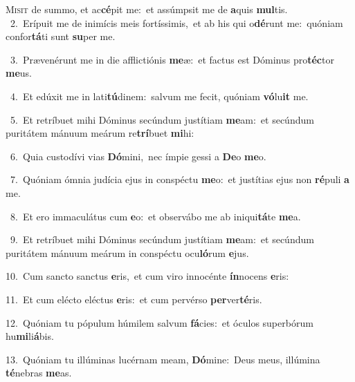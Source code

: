 \lettrine{\initial\textcolor{\initialcolor}{M}}{isit} de summo, et ac\-\textbf{cé}\-pit me:~\star et assúmpsit me de \textbf{a}\-quis \textbf{mul}\-tis.\\
{\numbfont\textcolor{\numbcolor}{~2.}}~Erípuit me de inimícis meis fortíssimis,~\dagger et ab his qui o\-\textbf{dé}\-runt me:~\star quóniam confor\-\textbf{tá}\-ti sunt \textbf{su}\-per me.\par
{\numbfont\textcolor{\numbcolor}{~3.}}~Prævenérunt me in die afflictiónis \textbf{me}\-æ:~\star et factus est Dóminus pro\-\textbf{téc}\-tor \textbf{me}\-us.\par
{\numbfont\textcolor{\numbcolor}{~4.}}~Et edúxit me in lati\-\textbf{tú}\-dinem:~\star salvum me fecit, quóniam \textbf{vó}\-lu\textbf{it} me.\par
{\numbfont\textcolor{\numbcolor}{~5.}}~Et retríbuet mihi Dóminus secúndum justítiam \textbf{me}\-am:~\star et secúndum puritátem mánuum meárum re\-\textbf{trí}\-buet \textbf{mi}\-hi:\par
{\numbfont\textcolor{\numbcolor}{~6.}}~Quia custodívi vias \textbf{Dó}\-mini,~\star nec ímpie gessi a \textbf{De}\-o \textbf{me}\-o.\par
{\numbfont\textcolor{\numbcolor}{~7.}}~Quóniam ómnia judícia ejus in conspéctu \textbf{me}\-o:~\star et justítias ejus non \textbf{ré}\-puli \textbf{a} me.\par
{\numbfont\textcolor{\numbcolor}{~8.}}~Et ero immaculátus cum \textbf{e}\-o:~\star et observábo me ab iniqui\-\textbf{tá}\-te \textbf{me}\-a.\par
{\numbfont\textcolor{\numbcolor}{~9.}}~Et retríbuet mihi Dóminus secúndum justítiam \textbf{me}\-am:~\star et secúndum puritátem mánuum meárum in conspéctu ocu\-\textbf{ló}\-rum \textbf{e}\-jus.\par
{\numbfont\textcolor{\numbcolor}{10.}}~Cum sancto sanctus \textbf{e}\-ris,~\star et cum viro innocénte \textbf{ín}\-nocens \textbf{e}\-ris:\par
{\numbfont\textcolor{\numbcolor}{11.}}~Et cum elécto eléctus \textbf{e}\-ris:~\star et cum pervérso \textbf{per}\-ver\-\textbf{té}\-ris.\par
{\numbfont\textcolor{\numbcolor}{12.}}~Quóniam tu pópulum húmilem salvum \textbf{fá}\-cies:~\star et óculos superbórum hu\-\textbf{mi}\-li\-\textbf{á}\-bis.\par
{\numbfont\textcolor{\numbcolor}{13.}}~Quóniam tu illúminas lucérnam meam, \textbf{Dó}\-mine:~\star Deus meus, illúmina \textbf{té}\-nebras \textbf{me}\-as.\par
